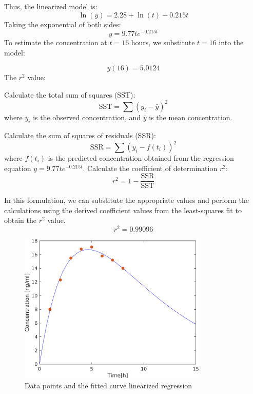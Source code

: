 \documentclass[12pt, a4paper]{article}
\numberwithin{equation}{section}
\begin{document}
Thus, the linearized model is:
\begin{equation}
    \ln(y) = 2.28 + \ln(t) - 0.215t
\end{equation}
Taking the exponential of both sides:
\begin{equation}
    y = 9.77te^{-0.215t}
\end{equation}
To estimate the concentration at $t = 16$ hours, we substitute $t = 16$ into the model:

\begin{equation}
    y(16) = 5.0124
\end{equation}
The $r^2$ value:

Calculate the total sum of squares (SST):
\begin{equation}
\text{SST} = \sum (y_i - \bar{y})^2
\end{equation}
where $y_i$ is the observed concentration, and $\bar{y}$ is the mean concentration.

Calculate the sum of squares of residuals (SSR):
\begin{equation}
\text{SSR} = \sum (y_i - f(t_i))^2
\end{equation}
where $f(t_i)$ is the predicted concentration obtained from the regression equation $y = 9.77te^{-0.215t}$.
Calculate the coefficient of determination $r^2$:
\begin{equation}
r^2 = 1 - \frac{\text{SSR}}{\text{SST}}
\end{equation}

In this formulation, we can substitute the appropriate values and perform the calculations using the derived coefficient values from the least-squares fit to obtain the $r^2$ value.
$$ r^2 = 0.99096$$
\begin{figure}[H]
  \centering
  \includegraphics[width=0.8\textwidth]{img/Q2plot.png}
  \captionsetup{justification=centering}
  \caption{Data points and the fitted curve linearized regression}
\end{figure}
\end{document}
